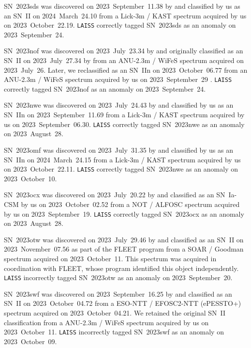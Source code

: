 \documentclass[twocolumn]{aastex63}
\begin{document}
SN~2023sds was discovered on 2023~September~11.38 by \cite{ALeRCE2023sds} and classified by us as an SN~II on 2024~March~24.10 from a Lick-3m / KAST spectrum acquired by us on 2023~October~22.19. \texttt{LAISS} correctly tagged SN~2023sds as an anomaly on 2023~September~24. \par

SN~2023nof was discovered on 2023~July~23.34 by \cite{ALeRCE2023nof} and originally classified as an SN~II on 2023~July~27.34 by \cite{DEbass2023nof} from an ANU-2.3m / WiFeS spectrum acquired on 2023~July~26. Later, we reclassified as an SN~IIn on 2023~October~06.77 from an ANU-2.3m / WiFeS spectrum acquired by us on 2023~September~29 \citep{Aleo2023nofTNS}. \texttt{LAISS} correctly tagged SN~2023nof as an anomaly on 2023~September~24. \par

SN~2023nwe was discovered on 2023~July~24.43 by \cite{PS12023nwe} and classified by us as an SN~IIn on 2023~September~11.69 \citep{Davis2023nwe} from a Lick-3m / KAST spectrum acquired by us on 2023~September~06.30. \texttt{LAISS} correctly tagged SN~2023nwe as an anomaly on 2023~August~28. \par

SN~2023omf was discovered on 2023~July~31.35 by \cite{ZTF2023omf} and classified by us as an SN~IIn on 2024~March~24.15 from a Lick-3m / KAST spectrum acquired by us on 2023~October~22.11. \texttt{LAISS} correctly tagged SN~2023nwe as an anomaly on 2023~October~10. \par

SN~2023ocx was discovered on 2023~July~20.22 by \cite{ZTF2023ocx} and classified as an SN~Ia-CSM by us on 2023~October~02.52 \citep{Angus2023ocx} from a NOT / ALFOSC spectrum acquired by us on 2023~September~19. \texttt{LAISS} correctly tagged SN~2023ocx as an anomaly on 2023~August~28. \par

SN~2023otw was discovered on 2023~July~29.46 by \cite{ZTF2023otw} and classified as an SN~II on 2023~November~07.56 \citep{FLEET2023otw} as part of the FLEET program \citep{Gomez2020} from a SOAR / Goodman spectrum acquired on 2023~October~11. This spectrum was acquired in coordination with FLEET, whose program identified this object independently. \texttt{LAISS} incorrectly tagged SN~2023otw as an anomaly on 2023~September~20. \par

SN~2023swf was discovered on 2023~September~16.25 by \cite{ZTF2023swf} and classified as an SN~II on 2023~October~04.72 \citep{Ayala2023swf} from a ESO-NTT / EFOSC2-NTT (ePESSTO+) spectrum acquired on 2023~October~04.21. We retained the original SN~II classification from a ANU-2.3m / WiFeS spectrum acquired by us on 2023~October~11. \texttt{LAISS} incorrectly tagged SN~2023swf as an anomaly on 2023~October~09. \par
\end{document}
